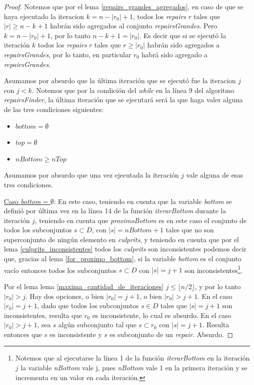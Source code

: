 \documentclass[11pt,a4paper,twoside]{tesis}
\newcommand{\parteEntera}{\lfloor n/2 \rfloor}
\begin{document}
\begin{proof}
 Notemos que por el lema \ref{repairs_grandes_agregados}, en caso de que se haya ejecutado la iteracion $k = n - |r_0| + 1$, todos los \textit{repairs} $r$ tales que $|r| \geq n - k + 1$ habrán sido agregados al conjunto \textit{repairsGrandes}. Pero $k = n - |r_0| + 1$, por lo tanto $n - k + 1 = |r_0|$. Es decir que si se ejecutó la iteración $k$ todos los \textit{repairs} $r$ tales que $r \geq |r_0|$ habrán sido agregados a \textit{repairsGrandes}, por lo tanto, en particular $r_0$ habrá sido agregado a \textit{repairsGrandes}.

Asumamos por absurdo que la última iteración que se ejecutó fue la iteracion $j$ con $j < k$. Notemos que por la condición del \textit{while} en la línea 9 del algoritmo \textit{repairsFinder}, la última iteración que se ejecutará será la que haga valer alguna de las tres condiciones siguientes:

\begin{itemize}
    \item $bottom = \emptyset$
    \item $top = \emptyset$
    \item $nBottom \geq nTop$
\end{itemize}

Asumamos por absurdo que una vez ejecutada la iteración $j$ vale alguna de esas tres condiciones.

\underline{Caso \textit{bottom} = $\emptyset$}: En este caso, teniendo en cuenta que la variable \textit{bottom}  se definió por última vez en la línea 14 de la función \textit{iterarBottom} durante la iteración $j$, teniendo en cuenta que \textit{proximoBottom} es en este caso el conjunto de todos los subconjuntos $s \subset D$, con $|s| = nBottom + 1$ tales que no son superconjunto de ningún elemento en \textit{culprits}, y teniendo en cuenta que por el lema \ref{culprits_inconsistentes} todos los \textit{culprits} son inconsistentes podemos decir que, gracias al lema \ref{for_proximo_bottom}, si la variable \textit{bottom} es el conjunto vacío entonces todos los subconjuntos $s \subset D$ con $|s| = j + 1$ son inconsistentes\footnote{Notemos que al ejecutarse la línea 1 de la función \textit{iterarBottom} en la iteración $j$ la variable \textit{nBottom} vale j, pues \textit{nBottom} vale 1 en la primera iteración y se incrementa en un valor en cada iteración.}.

Por el lema lema \ref{maxima_cantidad_de_iteraciones} $j\leq \parteEntera$, y por lo tanto $|r_0| > j$. Hay dos opciones, o bien $|r_0| = j + 1$, o bien $|r_0| > j + 1$. En el caso $|r_0| = j + 1$, dado que todos los subconjuntos $s \in D$ tales que $|s| = j + 1$ son inconsistentes, resulta que $r_0$ es inconsistente, lo cual es absurdo. En el caso $|r_0| > j + 1$, sea $s$ algún subconjunto tal que $s \subset r_0$ con $|s| = j + 1$. Resulta entonces que $s$ es inconsistente y $s$ es subconjunto de un \textit{repair}. Absurdo. 


\end{proof}
\end{document}
